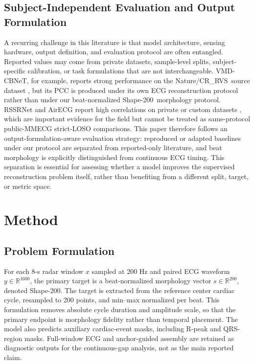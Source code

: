\documentclass[lettersize,journal]{IEEEtran}
\newcommand{\shape}{Shape-200\xspace}
\newcommand{\crrvs}{CR\_RVS\xspace}
\begin{document}
\subsection{Subject-Independent Evaluation and Output Formulation}
A recurring challenge in this literature is that model architecture, sensing hardware, output definition, and evaluation protocol are often entangled. Reported values may come from private datasets, sample-level splits, subject-specific calibration, or task formulations that are not interchangeable. VMD-CBNeT, for example, reports strong performance on the Nature/\crrvs\ source dataset \cite{xu2025vmdcbnet}, but its PCC is produced under its own ECG reconstruction protocol rather than under our beat-normalized \shape\ morphology protocol. RSSRNet and AirECG report high correlations on private or custom datasets \cite{rssrnet,airecg}, which are important evidence for the field but cannot be treated as same-protocol public-MMECG strict-LOSO comparisons. This paper therefore follows an output-formulation-aware evaluation strategy: reproduced or adapted baselines under our protocol are separated from reported-only literature, and beat morphology is explicitly distinguished from continuous ECG timing. This separation is essential for assessing whether a model improves the supervised reconstruction problem itself, rather than benefiting from a different split, target, or metric space.

\section{Method}

\subsection{Problem Formulation}
For each 8-s radar window $x$ sampled at 200 Hz and paired ECG waveform $y \in \mathbb{R}^{1600}$, the primary target is a beat-normalized morphology vector $s \in \mathbb{R}^{200}$, denoted \shape. The target is extracted from the reference center cardiac cycle, resampled to 200 points, and min--max normalized per beat. This formulation removes absolute cycle duration and amplitude scale, so that the primary endpoint is morphology fidelity rather than temporal placement. The model also predicts auxiliary cardiac-event masks, including R-peak and QRS-region masks. Full-window ECG and anchor-guided assembly are retained as diagnostic outputs for the continuous-gap analysis, not as the main reported claim.
\end{document}
